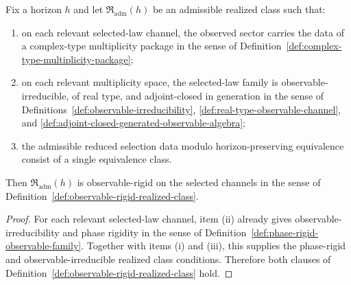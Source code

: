 \begin{corollary}
\label{cor:adjoint-closed-real-type-implies-observable-rigid}
Fix a horizon $h$ and let $\mathfrak R_{\mathrm{adm}}(h)$ be an admissible
realized class such that:
\begin{enumerate}[label=(\roman*), leftmargin=2em, itemsep=0.2em]
\item on each relevant selected-law channel, the observed sector carries the
      data of a complex-type multiplicity package in the sense of
      Definition~\ref{def:complex-type-multiplicity-package};
\item on each relevant multiplicity space, the selected-law family is
      observable-irreducible, of real type, and adjoint-closed in generation
      in the sense of Definitions~\ref{def:observable-irreducibility},
      \ref{def:real-type-observable-channel}, and
      \ref{def:adjoint-closed-generated-observable-algebra};
\item the admissible reduced selection data modulo horizon-preserving
      equivalence consist of a single equivalence class.
\end{enumerate}
Then $\mathfrak R_{\mathrm{adm}}(h)$ is observable-rigid on the selected
channels in the sense of
Definition~\ref{def:observable-rigid-realized-class}.
\end{corollary}

\begin{proof}
For each relevant selected-law channel, item (ii) already gives
observable-irreducibility and phase rigidity in the sense of
Definition~\ref{def:phase-rigid-observable-family}. Together with items (i)
and (iii), this supplies the phase-rigid and observable-irreducible realized
class conditions. Therefore both clauses of
Definition~\ref{def:observable-rigid-realized-class} hold.
\end{proof}

